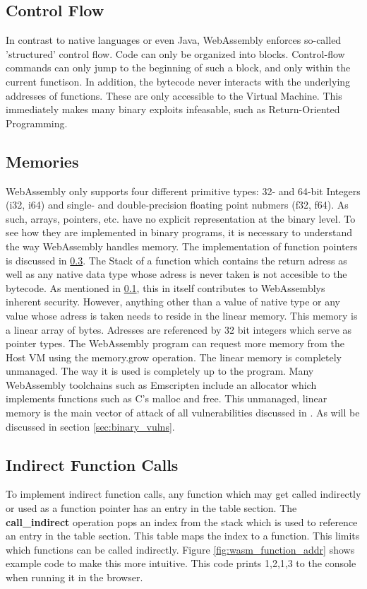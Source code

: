 \documentclass[sigconf]{acmart}
\begin{document}
\subsection{Control Flow}
\label{sec:wasm_control_flow}
In contrast to native languages or even Java, WebAssembly enforces so-called 'structured' control flow. Code can only be organized into blocks. Control-flow commands can only jump to the beginning of such a block, and only within the current functison. In addition, the bytecode never interacts with the underlying addresses of functions. These are only accessible to the Virtual Machine. This immediately makes many binary exploits infeasable, such as Return-Oriented Programming. 

\subsection{Memories} 
\label{sec:memories}
WebAssembly only supports four different primitive types: 32- and 64-bit Integers (i32, i64) and single- and double-precision floating point nubmers (f32, f64). As such, arrays, pointers, etc. have no explicit representation at the binary level. To see how they are implemented in binary programs, it is necessary to understand the way WebAssembly handles memory. The implementation of function pointers is discussed in \ref{sec:indirect_calls}. The Stack of a function which contains the return adress as well as any native data type whose adress is never taken is not accesible to the bytecode. As mentioned in \ref{sec:wasm_control_flow}, this in itself contributes to WebAssemblys inherent security. However, anything other than a value of native type or any value whose adress is taken needs to reside in the linear memory. This memory is a linear array of bytes. Adresses are referenced by 32 bit integers which serve as pointer types.   The WebAssembly program can request more memory from the Host VM using the memory.grow operation. The linear memory is completely unmanaged. The way it is used is completely up to the program. Many WebAssembly toolchains such as Emscripten include an allocator which implements functions such as C's malloc and free. This unmanaged, linear memory is the main vector of attack of all vulnerabilities discussed in \cite{lehmann_everything_2020}. As will be discussed in section  \ref{sec:binary_vulns}.


\subsection{Indirect Function Calls} 
\label{sec:indirect_calls}
To implement indirect function calls, any function which may get called indirectly or used as a function pointer has an entry in the table section. The \textbf{call\_indirect} operation pops an index from the stack which is used to reference an entry in the table section. This table maps the index to a function. This limits which functions can be called indirectly. Figure \ref{fig:wasm_function_addr} shows example code to make this more intuitive. This code prints 1,2,1,3 to the console when running it in the browser.
\end{document}
